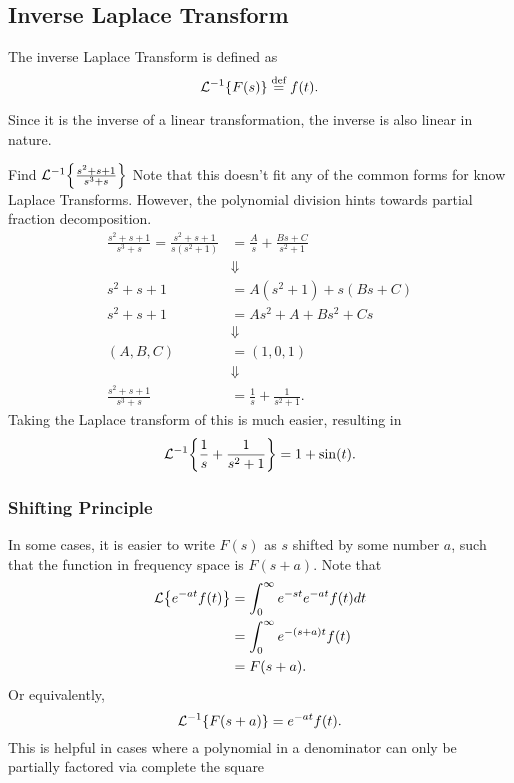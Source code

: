 \documentclass[../notes.tex]{subfiles}
\begin{document}
\subsection{Inverse Laplace Transform}

The inverse Laplace Transform is defined as
\newcommand{\equaldef}{
    \overset{\text{def}}{=}
}
\[
    \invlaplace{F(s)} \equaldef f(t)
.\]

Since it is the inverse of a linear transformation, the inverse is also linear in nature.

\begin{example}{Find $\mathcal{L}^{-1}\qty{ \frac{s^2 + s + 1}{s^3 + s} }$}
Note that this doesn't fit any of the common forms for know Laplace Transforms. However, the polynomial division hints towards partial fraction decomposition.
\begin{align*}
    \frac{s^2+s+1}{s^3+s} = \frac{s^2 + s + 1}{s (s^2 + 1)} &= \frac{A}{s} + \frac{Bs + C}{s^2 + 1}\\
    &\Downarrow \\
    s^2 + s + 1 &= A(s^2 + 1) + s(Bs + C) \\
    s^2 + s + 1 &= As^2 + A + Bs^2 + Cs \\
    &\Downarrow \\
    (A,B,C) &= (1, 0, 1) \\
    &\Downarrow \\
    \frac{s^2+s+1}{s^3+s} &= \frac{1}{s} + \frac{1}{s^2 + 1}
.\end{align*}
Taking the Laplace transform of this is much easier, resulting in
\[
    \mathcal{L}^{-1}\qty{ \frac{1}{s} + \frac{1}{s^2 + 1} } = 1 + \sin(t)
.\]
\end{example}

\subsubsection{Shifting Principle}

In some cases, it is easier to write $F(s)$ as  $s$ shifted by some number  $a$, such that the function in frequency space is  $F(s+a)$. Note that
 \begin{align*}
     \mathcal{L}\qty{ e^{-at}f(t) } &= \int_0^\infty e^{-st} e^{-at} f(t) dt \\
     &= \int_0^\infty e^{-(s+a)t} f(t) \\
     &= F(s+a)
.\end{align*}
Or equivalently,
\[
    \mathcal{L}^{-1}\qty{ F(s+a) } = e^{-at} f(t)
.\]
This is helpful in cases where a polynomial in a denominator can only be partially factored via complete the square
\end{document}

